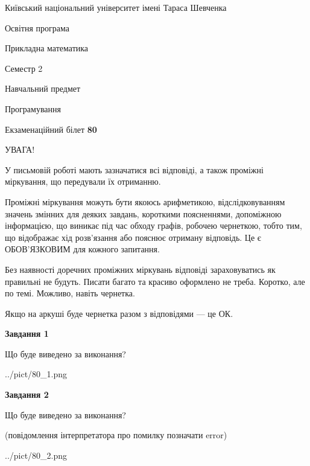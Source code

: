 \documentclass[12pt, ukrainian]{article}
\begin{document}
{{\begin {small}\par
{ \center  Київський національний університет імені Тараса Шевченка \par}
{\parbox {5 cm}{Освітня програма \hfill}{\parbox {7 cm}{Прикладна математика\hfill}}\parbox {6 cm}{\hfill Семестр 2}}\par
{\parbox {5 cm} {Навчальний предмет \hfill}\parbox {7 cm}{Програмування \hfill}\parbox {6cm}{\hfill}\par}\vspace{-7pt} \end{small}}{\center Екзаменаційний білет \No \textbf
{ 80 }\par}}
{
\begin {large}
УВАГА!

У письмовій роботі мають зазначатися всі відповіді, а також проміжні міркування, що передували їх отриманню.

Проміжні міркування можуть бути якоюсь арифметикою, відслідковуванням зна\-чень змінних для деяких завдань,
короткими поясненнями, допоміжною інформацією, що виникає під час обходу графів, робочею чернеткою,
тобто тим, що відображає хід розв’язання або пояснює отриману відповідь.
Це є ОБОВ’ЯЗКОВИМ для кожного запитання.

Без наявності доречних проміжних міркувань відповіді зараховуватись як правиль\-ні не будуть.
Писати багато та красиво оформлено не треба. Коротко, але по темі. Можли\-во, навіть чернетка.

Якщо на аркуші буде чернетка разом з відповідями --- це ОК.

\newpage

{\begin {center}\textbf{Завдання 1}\end {center}}\par
Що буде виведено за виконання?\par
\begin{center}
	{../pict/80_1.png}
\end{center}
\newpage

{\begin {center}\textbf{Завдання 2}\end {center}}\par
Що буде виведено за виконання?\par
 (повідомлення інтерпретатора про помилку позначати error)\par
\begin{center}
	{../pict/80_2.png}
\end{center}
\newpage


\end{large}}
\end{document}
